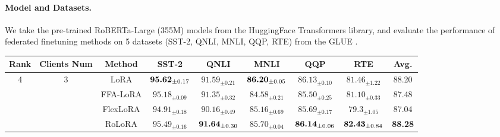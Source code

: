 \documentclass{article}
\theoremstyle{plain}
\theoremstyle{definition}
\theoremstyle{remark}
\begin{document}
\paragraph{Model and Datasets.} We take the pre-trained RoBERTa-Large (355M) \cite{liu2019roberta} models from the HuggingFace Transformers library, and evaluate the performance of federated finetuning methods on 5 datasets (SST-2, QNLI, MNLI, QQP, RTE) from the GLUE \cite{wang2019glue}. 

\begin{table}[h!]
\centering
{\scriptsize
\begin{tabular}{ccccccccc}
    \toprule
    Rank & Clients Num & Method & SST-2 & QNLI & MNLI & QQP & RTE & Avg. \\
    \midrule

    \multirow{4}{*}{4} & \multirow{4}{*}{3}
    & LoRA       & $\text{\textbf{95.62}}_{\pm \text{0.17}}$ & $\text{91.59}_{\pm \text{0.21}}$ & $\text{\textbf{86.20}}_{\pm \text{0.05}}$ & $\text{86.13}_{\pm \text{0.10}}$ & $\text{81.46}_{\pm \text{1.22}}$ & 88.20 \\
    &             & FFA-LoRA   & $\text{95.18}_{\pm \text{0.09}}$ & $\text{91.35}_{\pm \text{0.32}}$ & $\text{84.58}_{\pm \text{0.21}}$ & $\text{85.50}_{\pm \text{0.25}}$ & $\text{81.10}_{\pm \text{0.33}}$ & 87.48 \\
    &             & FlexLoRA   & $\text{94.91}_{\pm \text{0.18}}$ & $\text{90.16}_{\pm \text{0.49}}$ & $\text{85.16}_{\pm \text{0.69}}$ & $\text{85.69}_{\pm \text{0.17}}$ & $\text{79.3}_{\pm \text{1.05}}$  & 87.04 \\
    &             & \cellcolor{ours} RoLoRA & \cellcolor{ours} $\text{95.49}_{\pm \text{0.16}}$ & \cellcolor{ours} $\text{\textbf{91.64}}_{\pm \text{0.30}}$ & \cellcolor{ours}  $\text{85.70}_{\pm \text{0.04}}$ & \cellcolor{ours}  $\text{\textbf{86.14}}_{\pm \text{0.06}}$ & \cellcolor{ours} $\text{\textbf{82.43}}_{\pm \text{0.84}}$ & \cellcolor{ours} \textbf{88.28} \\
    \midrule


\end{tabular}}
\end{table}
\end{document}
